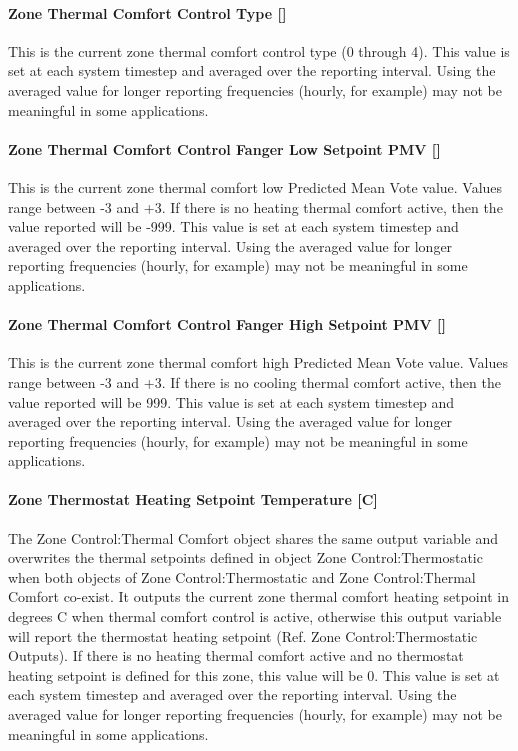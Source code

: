 \paragraph{Zone Thermal Comfort Control Type {[]}}\label{zone-thermal-comfort-control-type}

This is the current zone thermal comfort control type (0 through 4). This value is set at each system timestep and averaged over the reporting interval. Using the averaged value for longer reporting frequencies (hourly, for example) may not be meaningful in some applications.

\paragraph{Zone Thermal Comfort Control Fanger Low Setpoint PMV {[]}}\label{zone-thermal-comfort-control-fanger-low-setpoint-pmv}

This is the current zone thermal comfort low Predicted Mean Vote value. Values range between -3 and +3. If there is no heating thermal comfort active, then the value reported will be -999. This value is set at each system timestep and averaged over the reporting interval. Using the averaged value for longer reporting frequencies (hourly, for example) may not be meaningful in some applications.

\paragraph{Zone Thermal Comfort Control Fanger High Setpoint PMV {[]}}\label{zone-thermal-comfort-control-fanger-high-setpoint-pmv}

This is the current zone thermal comfort high Predicted Mean Vote value. Values range between -3 and +3. If there is no cooling thermal comfort active, then the value reported will be 999. This value is set at each system timestep and averaged over the reporting interval. Using the averaged value for longer reporting frequencies (hourly, for example) may not be meaningful in some applications.

\paragraph{Zone Thermostat Heating Setpoint Temperature {[}C{]}}\label{zone-thermostat-heating-setpoint-temperature-c-1}

The Zone Control:Thermal Comfort object shares the same output variable and overwrites the thermal setpoints defined in object Zone Control:Thermostatic when both objects of Zone Control:Thermostatic and Zone Control:Thermal Comfort co-exist. It outputs the current zone thermal comfort heating setpoint in degrees C when thermal comfort control is active, otherwise this output variable will report the thermostat heating setpoint (Ref. Zone Control:Thermostatic Outputs). If there is no heating thermal comfort active and no thermostat heating setpoint is defined for this zone, this value will be 0. This value is set at each system timestep and averaged over the reporting interval. Using the averaged value for longer reporting frequencies (hourly, for example) may not be meaningful in some applications.

